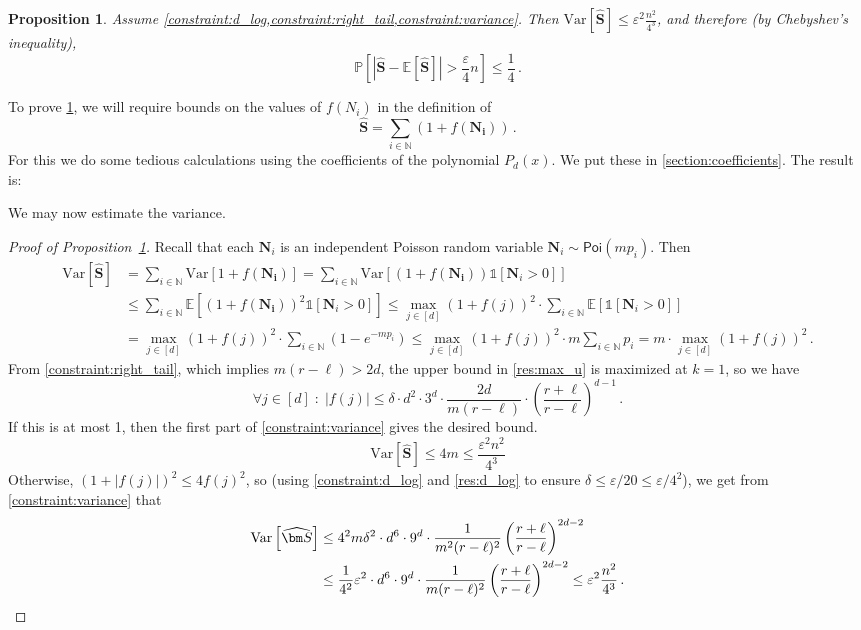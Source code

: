 \documentclass[10pt,a4paper]{article}
\makeatletter
\newtheorem{proposition}{Proposition}[section]
\newcommand\IfRestateTF{%
  \ifx\label\thmt@gobble@label %
    \expandafter\@firstoftwo
  \else
    \expandafter\@secondoftwo
  \fi
}
\newcommand{\RestateRemark}{\IfRestateTF{{\normalfont\bfseries (Restated) }}{}}
\newcommand{\Var}[1]{\mathrm{Var} \left[ #1 \right]}
\newcommand{\Ex}[1]{\bE \left[ #1 \right]}
\renewcommand{\Pr}[1]{\bP \left[ #1 \right]} %
\newcommand{\ind}[1]{\mathds{1} \left[ #1 \right] }
\newcommand{\bE}{\ensuremath{\mathbb{E}}}
\newcommand{\bN}{\ensuremath{\mathbb{N}}}
\newcommand{\bP}{\ensuremath{\mathbb{P}}}
\newcommand{\Poi}{\mathsf{Poi}}
\renewcommand{\epsilon}{\varepsilon}
\makeatother
\begin{document}
\begin{proposition}
\label{res:variance}
Assume \cref{constraint:d_log,constraint:right_tail,constraint:variance}. Then
$\Var{\widehat{\bm S}} \leq \epsilon^2 \frac{n^2}{4^3}$,
and therefore (by Chebyshev's inequality),
\[
  \Pr{ |\widehat{\bm S} - \Ex{\widehat{\bm S}}| > \frac{\epsilon}{4} n }
  \leq \frac{1}{4} \,.
\]
\end{proposition}

To prove \cref{res:variance}, we will require bounds on the values of $f(N_i)$ in the definition of
\[
  \widehat{\bm S} = \sum_{i \in \bN} ( 1 + f(\bm{N_i}) ) \,.
\]
For this we do some tedious calculations using the coefficients of the polynomial $P_d(x)$. We put
these in \cref{section:coefficients}. The result is:

We may now estimate the variance.

\begin{proof}[Proof of Proposition~\ref{res:variance}]
Recall that each $\bm{N}_i$ is an independent Poisson random variable $\bm{N}_i \sim \Poi(mp_i)$.
Then
\begin{align*}
\Var{\bm{\widehat S}}
&= \sum_{i \in \bN} \Var{1+f(\bm{N_i})}
= \sum_{i \in \bN} \Var{(1+f(\bm{N_i})) \ind{\bm{N}_i > 0}} \\
&\leq \sum_{i \in \bN} \Ex{(1+ f(\bm{N_i}) )^2 \ind{\bm{N}_i > 0}} 
\leq \max_{j \in [d]} (1+ f(j) )^2 \cdot  \sum_{i \in \bN} \Ex{\ind{\bm{N}_i > 0}} \\
&= \max_{j \in [d]} (1+f(j) )^2 \cdot \sum_{i \in \bN} (1 - e^{-mp_i}) 
\leq \max_{j \in [d]} (1+ f(j) )^2 \cdot m \sum_{i \in \bN} p_i
= m \cdot \max_{j \in [d]} (1+ f(j) )^2 \,.
\end{align*}
From \cref{constraint:right_tail}, which implies $m(r-\ell) > 2d$, the upper bound in
\cref{res:max_u} is maximized at $k=1$, so we have
\[
\forall j \in [d] \;:\; |f(j)| \leq \delta \cdot d^2 \cdot 3^d \cdot \frac{2d}{m(r-\ell)} \cdot
\left(\frac{r+\ell}{r-\ell}\right)^{d-1} \,.
\]
If this is at most 1, then the first part of \cref{constraint:variance} gives the desired bound.
\[
  \Var{\widehat{\bm S}} \leq 4m \leq \frac{\epsilon^2 n^2}{4^3}
\]
Otherwise, $(1+|f(j)|)^2 \leq 4f(j)^2$, so (using \cref{constraint:d_log} and \cref{res:d_log} to
ensure $\delta \leq \epsilon/20 \le \epsilon/4^2$), we get from \cref{constraint:variance} that
\begin{align*}
  \Var{\widehat{\bm S}}
  &\leq 4^2 m \delta^2 \cdot d^6 \cdot 9^d \cdot \frac{1}{m^2(r-\ell)^2} \left( \frac{r+\ell}{r-\ell}
\right)^{2d-2}  \\
  &\leq \frac{1}{4^2} \epsilon^2 \cdot d^6 \cdot 9^d \cdot \frac{1}{m(r-\ell)^2} \left( \frac{r+\ell}{r-\ell}
\right)^{2d-2} 
  \leq \epsilon^2 \frac{n^2}{4^3} \,. \qedhere
\end{align*}
\end{proof}
\end{document}
